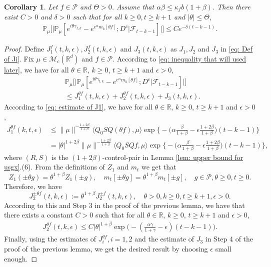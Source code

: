 \documentclass[12pt]{amsart}
\theoremstyle{plain}
\newtheorem{cor}[thm]{Corollary}
\theoremstyle{definition}
\numberwithin{equation}{section}
\begin{document}
\begin{cor}\label{cor: used in next corollary}
Let $f\in \mathcal{P}$ and $\Theta >0$.
Assume that $\alpha\beta\leq \kappa_fb(1+\beta)$.
Then there exist $C>0$ and $\delta>0$ such that for all $k \geq 0, t\geq k+1$ and $|\theta|\leq \Theta$,
\begin{align}
    \mathbb{P}_{\mu}\Big[\big|\mathbb{P}_{\mu}[e^{i\theta\gamma_{t,k}}-e^{e^{\alpha}m_k[\theta f]}; D^c | \mathscr F_{t-k-1}]\big|\Big]\leq Ce^{-\delta(t-k-1)}.
\end{align}
\end{cor}
\begin{proof}
	Define $J_1^f(t,k,\epsilon), J_2^f(t,k,\epsilon)$ and $J_3(t,k,\epsilon)$ as $J_1, J_2$ and $J_3$ in \eqref{eq: Def of Ji}.
	Fix $\mu \in \mathcal M_c(\mathbb R^d)$ and $f\in \mathcal P$.
    According to \eqref{eq: inequality that will used later},  we have for all $\theta\in \mathbb R$, $k\geq 0$, $t\geq k+1$ and $\epsilon> 0$,
\begin{align}
    &\mathbb{P}_{\mu}\Big[\big| \mathbb{P}_{\mu}[e^{i\theta \gamma_{t,k}}-e^{e^{\alpha}m_k[\theta f]}; D^c | \mathscr F_{t-k-1}]\big|\Big]
    \\&\leq J^{\theta f}_1(t,k,\epsilon) + J^{\theta f}_2(t,k,\epsilon)+J_3(t,k,\epsilon).
\end{align}
	According to \eqref{eq: estimate of J1}, we have for all $\theta\in \mathbb R$, $k\geq 0$, $t\geq k+1$ and $\epsilon> 0$,
\begin{align}
	J^{\theta f}_1(k,t,\epsilon)
     & \leq \|\mu\|^{-\frac{1+2\beta}{1+\beta}} \langle Q_0 SQ (\theta f), \mu \rangle \exp\Big\{-\Big(\alpha\frac{\beta}{1+\beta}-\epsilon\frac{1+2\beta}{1+\beta}\Big)(t-k-1)\Big\}
     \\& = |\theta|^{1+2\beta} \|\mu\|^{-\frac{1+2\beta}{1+\beta}} \langle Q_0 SQf, \mu \rangle \exp\Big\{-\Big(\alpha\frac{\beta}{1+\beta}-\epsilon\frac{1+2\beta}{1+\beta}\Big)(t-k-1)\Big\},
\end{align}
	where $(R,S)$ is the $(1+2\beta)$-control-pair in Lemma \ref{lem: upper bound for usgx}.(6).
	From the definitions of $Z_1$ and $m_t$ we get that
\[
	Z_1( \pm \theta g) = \theta^{1+\beta} Z_1(\pm g), \quad m_t[\pm \theta g] = \theta^{1+\beta} m_t[\pm g],\quad g\in \mathcal P, \theta \geq 0, t\geq 0.
\]
	Therefore, we have
\[
J^{\pm \theta f}_2(t,k,\epsilon)
	:= \theta^{1+\beta} J_2^{\pm f}(t,k,\epsilon), \quad \theta >0, k \geq 0, t\geq k+1, \epsilon > 0.
\]
	According to this and Step 3 in the proof of the previous lemma, we have that there exists a constant $C > 0$ such that for all $\theta\in \mathbb R$, $k\geq 0$, $t\geq k+1$ and $\epsilon> 0$,
\begin{align}
\label{eq:31step3b}
    J^{\theta f}_2(t,k,\epsilon)
    \leq C |\theta|^{1+\beta}\exp\Big(-(\frac{\alpha\gamma}{1+\gamma}-\epsilon)(t-k-1)\Big).
\end{align}
	Finally, using the estimates of $J^{\theta f}_{i}, i = 1,2$ and the estimate of $J_3$ in Step 4 of the proof of the previous lemma, we get the desired result by choosing $\epsilon$ small enough.
\end{proof}
\end{document}
